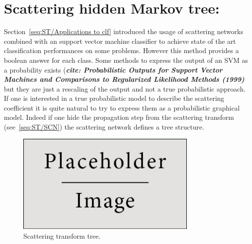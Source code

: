 \documentclass[a4paper,11pt]{report}
\begin{document}
{		
\chapter{Scattering hidden Markov tree:}
  \label{chap:SHMT}
  Section~\ref{seq:ST/Applications to clf} introduced the usage of scattering networks combined with an support vector machine classifier to achieve state of the art classification performances on some problems. However this method provides a boolean answer for each class. Some methods to express the output of an SVM as a probability exists (\textbf{\textit{cite: Probabilistic Outputs for Support Vector Machines and Comparisons to Regularized Likelihood Methods (1999)}} but they are just a rescaling of the output and not a true probabilistic approach. If one is interested in a true probabilistic model to describe the scattering coefficient it is quite natural to try to express them as a probabilistic graphical model. Indeed if one hide the propagation step from the scattering transform (see~\ref{seq:ST/SCN}) the scattering network defines a tree structure. \\

	\begin{figure}
			\begin{center}
				\includegraphics[width=3.5in]{placeholder.jpg}
				\caption{Scattering transform tree.} %
				\label{fig:ST tree}
			\end{center}
	\end{figure}
  
}
\end{document}
